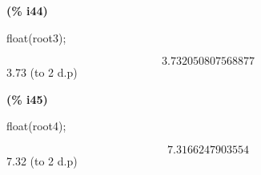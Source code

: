 \documentclass[fleqn]{article}
\begin{document}
\noindent
\begin{minipage}[t]{4.000000em}\color{red}\bfseries
(\% i44)	
\end{minipage}
\begin{minipage}[t]{\textwidth}\color{blue}
float(root3);
\end{minipage}
\[\displaystyle \tag{\% o44} 
3.732050807568877\mbox{}
\]
3.73 (to 2 d.p)


\noindent
\begin{minipage}[t]{4.000000em}\color{red}\bfseries
(\% i45)	
\end{minipage}
\begin{minipage}[t]{\textwidth}\color{blue}
float(root4);
\end{minipage}
\[\displaystyle \tag{\% o45} 
7.3166247903554\mbox{}
\]
7.32 (to 2 d.p)
\end{document}
